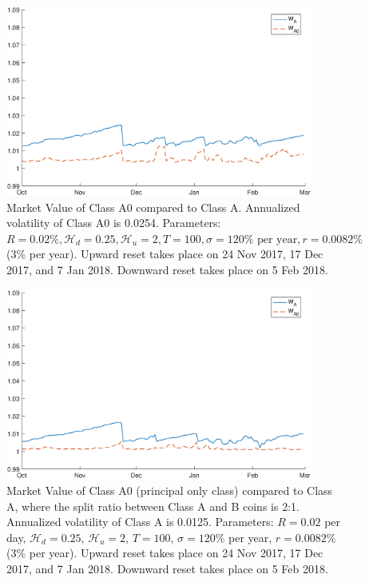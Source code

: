 \documentclass[11pt]{article}%
\numberwithin{equation}{section}
\theoremstyle{plain}
\begin{document}
\begin{appendices}
\begin{figure}[!htb]
\centering
\includegraphics[width=0.9\textwidth]{WA0_alpha1.eps}
\caption{Market Value of Class A0 compared to Class A. Annualized volatility of Class A0 is 0.0254. Parameters: $R=0.02\%,\mathcal{H}_{d}=0.25,\mathcal{H}_{u} =2,T=100,\sigma= 120 \% \text{ per year}, r=0.0082\%$ (3\% per year). Upward reset takes place on 24 Nov 2017, 17 Dec 2017, and 7 Jan 2018. Downward reset takes place on 5 Feb 2018.}
\label{fig:valA0a1}
\end{figure}


\begin{figure}[!htb]
\centering
\includegraphics[width=0.9\textwidth]{WA0_alpha2.eps}
\caption{Market Value of Class A0 (principal only class) compared to Class A, where the split ratio between Class A and B coins is 2:1. Annualized volatility of Class A is 0.0125. Parameters: $R=0.02$ per day, $\mathcal{H}_{d}=0.25$, $\mathcal{H}_{u} =2$, $T=100$, $\sigma= 120\%$ per year, $r=0.0082\%$ (3\% per year). Upward reset takes place on 24 Nov 2017, 17 Dec 2017, and 7 Jan 2018. Downward reset takes place on 5 Feb 2018.}
\label{fig:valA0a2}
\end{figure}







\end{appendices}
\end{document}
